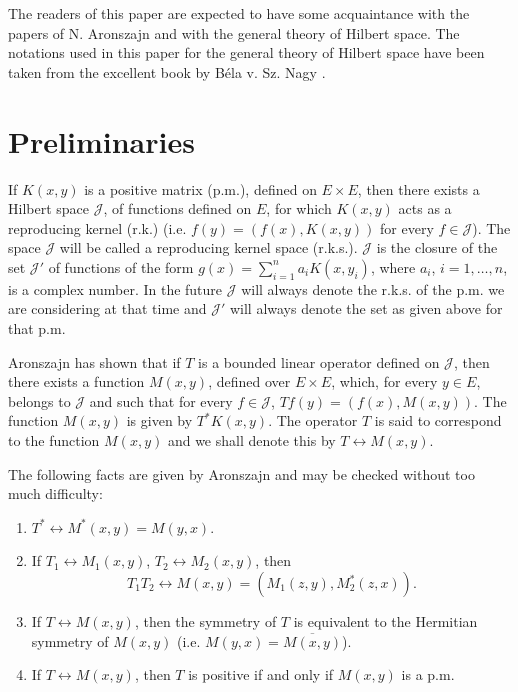\documentclass{article}
\begin{document}
The readers of this paper are expected to have some acquaintance with the papers of N. Aronszajn \cite{aronszajn1,aronszajn2} and with the general theory of Hilbert space. The notations used in this paper for the general theory of Hilbert space have been taken from the excellent book by Béla v. Sz. Nagy \cite{nagy}.

\section{Preliminaries}
\label{sec:preliminaries}

If $K(x, y)$ is a positive matrix (p.m.), defined on $E \times E$, then there exists a Hilbert space $\mathcal{J}$, of functions defined on $E$, for which $K(x, y)$ acts as a reproducing kernel (r.k.) (i.e. $f(y) = (f(x), K(x, y))$ for every $f \in \mathcal{J}$). The space $\mathcal{J}$ will be called a reproducing kernel space (r.k.s.). $\mathcal{J}$ is the closure of the set $\mathcal{J}'$ of functions of the form $g(x) = \sum_{i=1}^n a_i K(x, y_i)$, where $a_i$, $i = 1, \ldots, n$, is a complex number. In the future $\mathcal{J}$ will always denote the r.k.s. of the p.m. we are considering at that time and $\mathcal{J}'$ will always denote the set as given above for that p.m.

Aronszajn \cite{aronszajn2} has shown that if $T$ is a bounded linear operator defined on $\mathcal{J}$, then there exists a function $M(x, y)$, defined over $E \times E$, which, for every $y \in E$, belongs to $\mathcal{J}$ and such that for every $f \in \mathcal{J}$, $Tf(y) = (f(x), M(x, y))$. The function $M(x, y)$ is given by $T^*K(x, y)$. The operator $T$ is said to correspond to the function $M(x, y)$ and we shall denote this by $T \leftrightarrow M(x, y)$.

The following facts are given by Aronszajn \cite{aronszajn2} and may be checked without too much difficulty:
\begin{enumerate}[label=(\alph*)]
\item $T^* \leftrightarrow M^*(x,y) = M(y,x)$.
\item If $T_1 \leftrightarrow M_1(x, y)$, $T_2 \leftrightarrow M_2(x, y)$, then
\begin{equation}
T_1T_2 \leftrightarrow M(x, y) = (M_1(z, y), M_2^*(z, x)).
\label{eq:operator-product}
\end{equation}
\item If $T \leftrightarrow M(x, y)$, then the symmetry of $T$ is equivalent to the Hermitian symmetry of $M(x, y)$ (i.e. $M(y, x) = \overline{M(x, y)}$).
\item If $T \leftrightarrow M(x, y)$, then $T$ is positive if and only if $M(x, y)$ is a p.m.
\end{enumerate}
\end{document}
